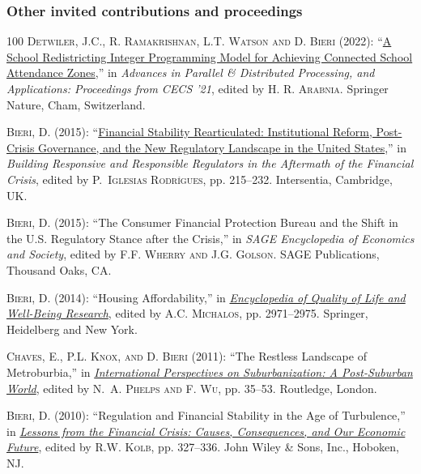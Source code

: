 \documentclass[letter,11pt]{article}
\begin{document}
\subsubsection*{Other invited contributions and proceedings}
\begingroup
\renewcommand{\section}[2]{}
\begin{thebibliography}{100}
\textsc{Detwiler, J.C., R. Ramakrishnan, L.T. Watson {\small and} D. Bieri} (2022): \enquote{\href{https://people.cs.vt.edu/~ramakris/papers/detwiler-csc21.pdf}{A School Redistricting Integer Programming Model for Achieving Connected School Attendance Zones},} in \emph{Advances in Parallel \& Distributed Processing, and Applications: Proceedings from CECS '21}, edited by \textsc{H. R. Arabnia}. Springer Nature, Cham, Switzerland.

\textsc{Bieri, D.} (2015): \enquote{\href{https://www.cambridge.org/core/books/building-responsive-and-responsible-financial-regulators-in-the-aftermath-of-the-global-financial-crisis/financial-stability-rearticulated-institutional-reform-postcrisis-governance-and-the-new-regulatory-landscape-in-the-united-states/4B60C37474E447CE36778DFFA8886470}{Financial Stability Rearticulated: Institutional Reform, Post-Crisis Governance, and the New Regulatory Landscape in the United States},} in \emph{Building Responsive and Responsible Regulators in the Aftermath of the Financial Crisis}, edited by \textsc{P.~Iglesias Rodr\'{i}gues}, pp. 215--232. Intersentia, Cambridge, UK.

\textsc{Bieri, D.} (2015): \enquote{The Consumer Financial Protection Bureau and the Shift in the U.S. Regulatory Stance after the Crisis,} in \emph{SAGE Encyclopedia of Economics and Society}, edited by \textsc{F.F. Wherry {\small and} J.G. Golson}. SAGE Publications, Thousand Oaks, CA.

\textsc{Bieri, D.}  (2014): \enquote{Housing Affordability,} in \href{http://www.springer.com/social+sciences/well-being/book/978-94-007-0752-8}{\emph{Encyclopedia of Quality of Life and Well-Being Research}}, edited by \textsc{A.C. Michalos}, pp. 2971--2975. Springer, Heidelberg and New York.

\textsc{Chaves, E., P.L. Knox,  {\small and} D. Bieri}  (2011): \enquote{The Restless Landscape of Metroburbia,} in \href{http://www.palgrave.com/products/title.aspx?pid=411927}{\emph{International Perspectives on Suburbanization: A Post-Suburban World}}, edited by \textsc{N.~A. Phelps {\small and} F. Wu}, pp. 35--53. Routledge, London.

\textsc{Bieri, D.} (2010): \enquote{Regulation and Financial Stability in the Age of Turbulence,} in \href{http://www.amazon.com/Lessons-Financial-Crisis-Consequences-Economic/dp/0470561777}{\emph{Lessons from the Financial Crisis: Causes, Consequences, and Our Economic Future}}, edited by \textsc{R.W. Kolb}, pp. 327--336. John Wiley \& Sons, Inc., Hoboken, NJ.
\end{thebibliography}
\endgroup
\end{document}
